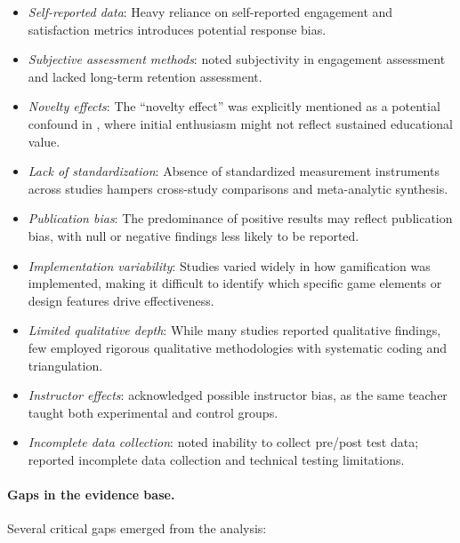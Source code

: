 \documentclass[a4paper,fleqn]{cas-sc}
\begin{document}
\begin{itemize}[noitemsep]
 \item \textit{Self-reported data}: Heavy reliance on self-reported engagement and satisfaction metrics \citep{9Lin2018, 15Slater2022, 47Clara2010156, 71lynch2015pedagogical} introduces potential response bias.
 
 \item \textit{Subjective assessment methods}: \citet{1Barbatsis201159} noted subjectivity in engagement assessment and lacked long-term retention assessment.
 \item \textit{Novelty effects}: The ``novelty effect'' was explicitly mentioned as a potential confound in \citet{47Clara2010156}, where initial enthusiasm might not reflect sustained educational value.
 \item \textit{Lack of standardization}: Absence of standardized measurement instruments across studies hampers cross-study comparisons and meta-analytic synthesis.
 
 \item \textit{Publication bias}: The predominance of positive results may reflect publication bias, with null or negative findings less likely to be reported.
 
 \item \textit{Implementation variability}: Studies varied widely in how gamification was implemented, making it difficult to identify which specific game elements or design features drive effectiveness.
 
 \item \textit{Limited qualitative depth}: While many studies reported qualitative findings, few \citep{12Gilbert2019108, 71lynch2015pedagogical} employed rigorous qualitative methodologies with systematic coding and triangulation.
 
 \item \textit{Instructor effects}: \citet{8Yu2014} acknowledged possible instructor bias, as the same teacher taught both experimental and control groups.
 \item \textit{Incomplete data collection}: \citet{65Razak201139} noted inability to collect pre/post test data; \citet{60Hoy2018} reported incomplete data collection and technical testing limitations.
\end{itemize}

\paragraph{Gaps in the evidence base.}

Several critical gaps emerged from the analysis:
\end{document}
